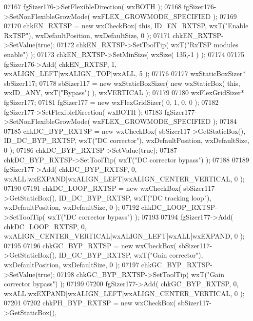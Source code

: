 \begin{DoxyCode}
07167     fgSizer176->SetFlexibleDirection( wxBOTH );
07168     fgSizer176->SetNonFlexibleGrowMode( wxFLEX\_GROWMODE\_SPECIFIED );
07169     
07170     chkEN_RXTSP = \textcolor{keyword}{new} wxCheckBox( \textcolor{keyword}{this}, ID_EN_RXTSP, wxT(\textcolor{stringliteral}{"Enable RxTSP"}), wxDefaultPosition, wxDefaultSize,
       0 );
07171     chkEN_RXTSP->SetValue(\textcolor{keyword}{true}); 
07172     chkEN_RXTSP->SetToolTip( wxT(\textcolor{stringliteral}{"RxTSP modules enable"}) );
07173     chkEN_RXTSP->SetMinSize( wxSize( 135,-1 ) );
07174     
07175     fgSizer176->Add( chkEN_RXTSP, 1, wxALIGN\_LEFT|wxALIGN\_TOP|wxALL, 5 );
07176     
07177     wxStaticBoxSizer* sbSizer117;
07178     sbSizer117 = \textcolor{keyword}{new} wxStaticBoxSizer( \textcolor{keyword}{new} wxStaticBox( \textcolor{keyword}{this}, wxID\_ANY, wxT(\textcolor{stringliteral}{"Bypass"}) ), wxVERTICAL );
07179     
07180     wxFlexGridSizer* fgSizer177;
07181     fgSizer177 = \textcolor{keyword}{new} wxFlexGridSizer( 0, 1, 0, 0 );
07182     fgSizer177->SetFlexibleDirection( wxBOTH );
07183     fgSizer177->SetNonFlexibleGrowMode( wxFLEX\_GROWMODE\_SPECIFIED );
07184     
07185     chkDC_BYP_RXTSP = \textcolor{keyword}{new} wxCheckBox( sbSizer117->GetStaticBox(), 
      ID_DC_BYP_RXTSP, wxT(\textcolor{stringliteral}{"DC corrector"}), wxDefaultPosition, wxDefaultSize, 0 );
07186     chkDC_BYP_RXTSP->SetValue(\textcolor{keyword}{true}); 
07187     chkDC_BYP_RXTSP->SetToolTip( wxT(\textcolor{stringliteral}{"DC corrector bypass"}) );
07188     
07189     fgSizer177->Add( chkDC_BYP_RXTSP, 0, wxALL|wxEXPAND|wxALIGN\_LEFT|wxALIGN\_CENTER\_VERTICAL, 0 );
07190     
07191     chkDC_LOOP_RXTSP = \textcolor{keyword}{new} wxCheckBox( sbSizer117->GetStaticBox(), 
      ID_DC_BYP_RXTSP, wxT(\textcolor{stringliteral}{"DC tracking loop"}), wxDefaultPosition, wxDefaultSize, 0 );
07192     chkDC_LOOP_RXTSP->SetToolTip( wxT(\textcolor{stringliteral}{"DC corrector bypass"}) );
07193     
07194     fgSizer177->Add( chkDC_LOOP_RXTSP, 0, wxALIGN\_CENTER\_VERTICAL|wxALIGN\_LEFT|wxALL|wxEXPAND, 0 );
07195     
07196     chkGC_BYP_RXTSP = \textcolor{keyword}{new} wxCheckBox( sbSizer117->GetStaticBox(), 
      ID_GC_BYP_RXTSP, wxT(\textcolor{stringliteral}{"Gain corrector"}), wxDefaultPosition, wxDefaultSize, 0 );
07197     chkGC_BYP_RXTSP->SetValue(\textcolor{keyword}{true}); 
07198     chkGC_BYP_RXTSP->SetToolTip( wxT(\textcolor{stringliteral}{"Gain corrector bypass"}) );
07199     
07200     fgSizer177->Add( chkGC_BYP_RXTSP, 0, wxALL|wxEXPAND|wxALIGN\_LEFT|wxALIGN\_CENTER\_VERTICAL, 0 );
07201     
07202     chkPH_BYP_RXTSP = \textcolor{keyword}{new} wxCheckBox( sbSizer117->GetStaticBox(), 

\end{DoxyCode}
